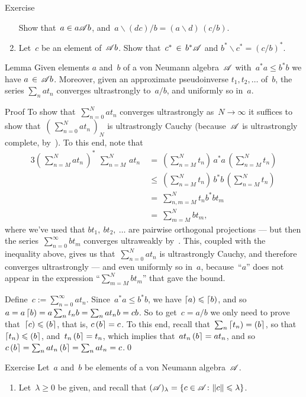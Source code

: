 \documentclass[a]{subfiles}
\begin{document}
\begin{parsec}
\begin{point}{Exercise}
\begin{enumerate}
Show that~$a\in a\mathscr{A} b$,
and~$a\backslash (dc) / b  = (a\backslash d)\,(c/b)$.
\item
Let~$c$ be an element of~$\mathscr{A} b$.
Show that~$c^* \,\in\, b^* \mathscr{A}$
and $b^*\backslash c^* = (c/b)^*$.
\end{enumerate}
\end{point}
\begin{point}{Lemma}%
Given elements $a$ and~$b$ of a von Neumann algebra~$\mathscr{A}$
with~$a^*a \leq b^*b$
we have $a\,\in\, \mathscr{A} b$.
Moreover,
given an approximate pseudoinverse $t_1,t_2,\dotsc$
of~$b$,
the series $\sum_nat_n$ converges ultrastrongly to~$a/b$,
and uniformly so in~$a$.
\begin{point}{Proof}%
To show that~$\sum_{n=0}^N at_n$
converges ultrastrongly as~$N\to \infty$
it suffices
to show that~$(\,\sum_{n=0}^N at_n\,)_N$
is ultrastrongly Cauchy
(because~$\mathscr{A}$ is ultrastrongly complete, by~).
To this end, note that
\begin{alignat*}{3}
\textstyle 
(\, \sum_{n=M}^N at_n\,)^*\ \,\sum_{n=M}^N\,at_n
\ &= \textstyle\ (\sum_{n=M}^Nt_n) \,a^*a\, (\sum_{n=M}^N t_n)
\\
\ &\leq\ \textstyle 
 (\sum_{n=M}^N t_n) \,b^*b\, (\sum_{n=M}^Nt_n)
\\
\ &= \ \textstyle 
\sum_{n,m=M}^N
t_nb^*bt_m 
\\
\ &=\ \textstyle 
\sum_{m=M}^N
bt_m,
\end{alignat*}
where we've used that
$bt_1,\ bt_2,\ \dotsc$
are pairwise orthogonal projections
--- but then the series~$\sum_{n=0}^\infty bt_m$
converges ultraweakly by~.
This, coupled with the
inequality above,
gives us that~$\sum_{n=0}^N at_n$
is ultrastrongly Cauchy,
and therefore converges ultrastrongly --- 
and even uniformly so in~$a$,
because~``$a$'' does not appear in
the expression
``$\sum_{m=M}^N bt_m$'' that gave the bound.

Define~$c:=\sum_{n=0}^\infty at_n$.
Since~$a^*a \leq b^*b$,
we have $\left\lceil a\right)\leqslant \left\lceil b\right)$,
and so~$a=a\left\lceil b\right) = a\sum_n t_n b = \sum_n at_n b = cb$. 
So to get~$c=a/b$
we only need to prove that~$\left\lceil c\right)\leqslant \left(b\right\rceil$,
that is, $c\left(b\right\rceil=c$.
To this end,
recall that~$\sum_n \left\lceil t_n\right)=\left(b\right\rceil$,
so that~$\left\lceil t_n\right)\leqslant \left(b\right\rceil$,
and~$t_n\left(b\right\rceil=t_n$,
which implies
that~$at_n\left(b\right\rceil=at_n$,
and so~$c\left(b\right\rceil=\sum_n at_n\left(b\right\rceil
= \sum_n at_n=c$.\qed

\end{point}
\end{point}
\begin{point}[douglas]{Exercise}%
Let~$a$ and~$b$ be elements of a von Neumann algebra~$\mathscr{A}$.
\begin{enumerate}
\item
Let~$\lambda\geq 0$ be given,
and recall that $(\mathscr{A})_\lambda 
= \{c\in\mathscr{A}\colon \|c\|\leqslant\lambda\}$.


\end{enumerate}
\end{point}
\end{parsec}
\end{document}
